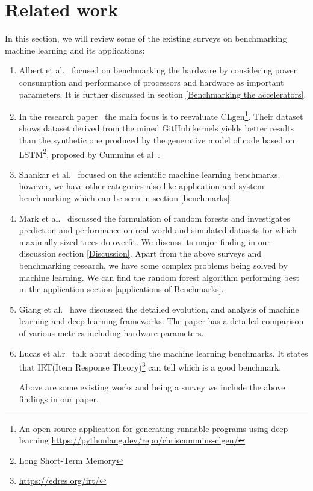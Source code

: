 \documentclass[a4paper,UKenglish,cleveref, autoref, thm-restate]{lipics-v2021}
\begin{document}
\section{Related work}
\label{related work}
In this section, we will review some of the existing surveys on benchmarking machine learning and its applications:
\begin{enumerate}
\item Albert et al.~\cite{accele} focused on benchmarking the hardware by considering power consumption and performance of processors and hardware as important parameters. It is further discussed in section \ref{Benchmarking the accelerators}.
\item In the research paper~\cite{casesynthesizing} the main focus is to reevaluate CLgen\footnote{An open source application for generating runnable programs using deep learning \url{https://pythonlang.dev/repo/chriscummins-clgen/}}. Their dataset shows dataset derived from the mined GitHub kernels yields better results than the synthetic one produced by the generative model of code based on LSTM\footnote{Long Short-Term Memory}, proposed by Cummins et al~\cite{cuminsetal}.
\item  Shankar et al.~\cite{sctmlb} focused on the scientific machine learning benchmarks, however, we have other categories also like application and system benchmarking which can be seen in section \ref{benchmarks}.
\item Mark et al.~\cite{randomforestregression} discussed the formulation of random forests and investigates prediction and performance on real-world and simulated datasets for which maximally sized trees do overfit. We discuss its major finding in our discussion section \ref{Discussion}.
Apart from the above surveys and benchmarking research, we have some complex problems being solved by machine learning. We can find the random forest algorithm performing best in the application section \ref{applications of Benchmarks}.
\item Giang et al.~\cite{RefWorksframework} have discussed the detailed evolution, and analysis of machine learning and deep learning frameworks. The paper has a detailed comparison of various metrics including hardware parameters.
\item Lucas et al.r~\cite{decodingmlb} talk about decoding the machine learning benchmarks. It states that IRT(Item Response Theory)\footnote{\url{https://edres.org/irt/}} can tell which is a good benchmark.

Above are some existing works and being a survey we include the above findings in our paper.
\end{enumerate}
\end{document}
